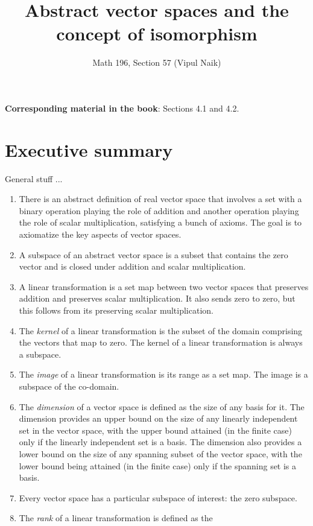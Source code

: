 \documentclass[10pt]{amsart}
\title{Abstract vector spaces and the concept of isomorphism}
\author{Math 196, Section 57 (Vipul Naik)}
\begin{document}
\maketitle

{\bf Corresponding material in the book}: Sections 4.1 and 4.2.

\section*{Executive summary}

General stuff ...

\begin{enumerate}
\item There is an abstract definition of real vector space that
  involves a set with a binary operation playing the role of addition
  and another operation playing the role of scalar multiplication,
  satisfying a bunch of axioms. The goal is to axiomatize the key
  aspects of vector spaces.
\item A subspace of an abstract vector space is a subset that contains
  the zero vector and is closed under addition and scalar
  multiplication.
\item A linear transformation is a set map between two vector spaces
  that preserves addition and preserves scalar multiplication. It also
  sends zero to zero, but this follows from its preserving scalar
  multiplication.
\item The {\em kernel} of a linear transformation is the subset of the
  domain comprising the vectors that map to zero. The kernel of a
  linear transformation is always a subspace.
\item The {\em image} of a linear transformation is its range as a set
  map. The image is a subspace of the co-domain.
\item The {\em dimension} of a vector space is defined as the size of
  any basis for it. The dimension provides an upper bound on the size
  of any linearly independent set in the vector space, with the upper
  bound attained (in the finite case) only if the linearly independent
  set is a basis. The dimension also provides a lower bound on the
  size of any spanning subset of the vector space, with the lower
  bound being attained (in the finite case) only if the spanning set
  is a basis.
\item Every vector space has a particular subspace of interest: the
  zero subspace.
\item The {\em rank} of a linear transformation is defined as the

\end{enumerate}
\end{document}
